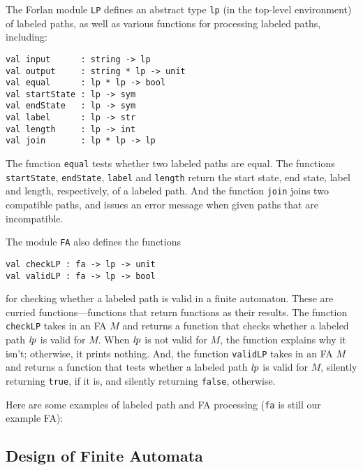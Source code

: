 The Forlan module \texttt{LP} defines an abstract type \texttt{lp} (in the
top-level environment) of labeled paths, as well as various functions
for processing labeled paths, including:
\begin{verbatim}
val input      : string -> lp
val output     : string * lp -> unit
val equal      : lp * lp -> bool
val startState : lp -> sym
val endState   : lp -> sym
val label      : lp -> str
val length     : lp -> int
val join       : lp * lp -> lp
\end{verbatim}
%
%
%
%
%
%
%
%
The function \texttt{equal} tests whether two labeled paths are
equal.  The functions \texttt{startState}, \texttt{endState},
\texttt{label} and \texttt{length} return the start state, end
state, label and length, respectively, of a labeled path.  And
the function \texttt{join} joins two compatible paths, and issues
an error message when given paths that are incompatible.

The module \texttt{FA} also defines the functions
\begin{verbatim}
val checkLP : fa -> lp -> unit
val validLP : fa -> lp -> bool
\end{verbatim}
%
%
for checking whether a labeled path is valid in a finite automaton.
These are curried functions---functions that return functions
as their results.
The function \texttt{checkLP} takes in an FA $M$ and returns a function
that checks whether a labeled path ${\it lp}$ is valid for $M$.  When
${\it lp}$ is not valid for $M$, the function explains why it isn't;
otherwise, it prints nothing. 
And, the function \texttt{validLP} takes in an FA $M$ and returns a function
that tests whether a labeled path ${\it lp}$ is valid for $M$, silently
returning \texttt{true}, if it is, and silently returning \texttt{false},
otherwise.

Here are some examples of labeled path and FA processing
(\texttt{fa} is still our example FA):


\subsection{Design of Finite Automata}

